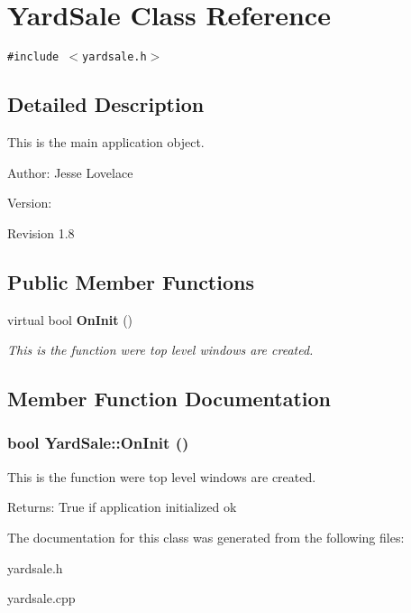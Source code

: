 \section{Yard\-Sale Class Reference}
\label{classYardSale}
{\tt \#include $<$yardsale.h$>$}



\subsection{Detailed Description}
This is the main application object. 

\begin{Desc}
\item[Author:]Jesse Lovelace \end{Desc}
\begin{Desc}
\item[Version:]\begin{Desc}
\item[Revision]1.8 \end{Desc}
\end{Desc}


\subsection*{Public Member Functions}
\begin{CompactItemize}
\item 
virtual bool {\bf On\-Init} ()
\begin{CompactList}\small\item\em This is the function were top level windows are created. \item\end{CompactList}\end{CompactItemize}


\subsection{Member Function Documentation}
\subsubsection{\setlength{\rightskip}{0pt plus 5cm}bool Yard\-Sale::On\-Init ()\hspace{0.3cm}{\tt  [virtual]}}\label{classYardSale_a0}


This is the function were top level windows are created. 

\begin{Desc}
\item[Returns:]True if application initialized ok \end{Desc}


The documentation for this class was generated from the following files:\begin{CompactItemize}
\item 
yardsale.h\item 
yardsale.cpp\end{CompactItemize}
